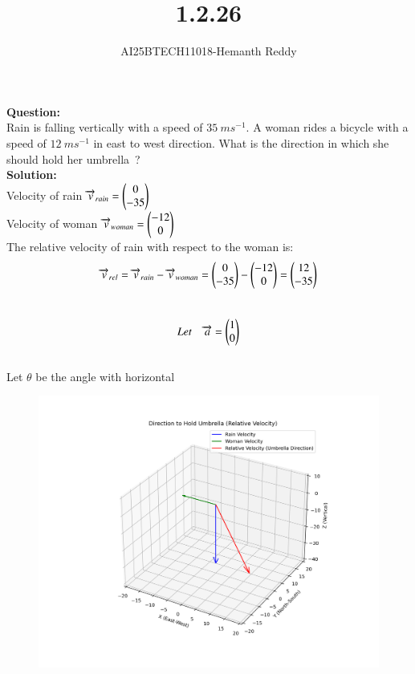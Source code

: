 \documentclass[journal]{IEEEtran}
\begin{document}

\vspace{3cm}

\title{1.2.26}
\author{AI25BTECH11018-Hemanth Reddy}
 \maketitle
{\let\newpage\relax\maketitle}

\renewcommand{\thefigure}{\theenumi}
\renewcommand{\thetable}{\theenumi}
\setlength{\intextsep}{10pt} %


\renewcommand{\thetable}{\theenumi}

\textbf{Question:}\\

Rain is falling vertically with a speed of $35~ms^{-1}$. A woman rides a bicycle with a speed of $12~ms^{-1}$ in east to west direction. What is the direction in which she should hold her umbrella~?\\
\textbf{Solution:}\\

Velocity of rain $\overrightarrow{v}_{rain}=\myvec{0\\
-35}$\\
\vspace{0.7cm}
Velocity of woman $\overrightarrow{v}_{woman}=\myvec{-12\\0}$\\
The relative velocity of rain with respect to the woman is:$$\overrightarrow{v}_{rel}=\overrightarrow{v}_{rain}-\overrightarrow{v}_{woman}\\ = \myvec{0\\
-35}-\myvec{-12\\0}= \myvec{12\\-35}$$\\
 $$Let \quad 
\overrightarrow{a} = \myvec{1\\0}$$\\

Let $\theta$ be the angle with horizontal\\

\begin{figure}
    \centering
    \includegraphics[width=0.8\columnwidth]{figs/fig.png}
    \caption{}
    \label{fig:placeholder}
\end{figure}
\end{document}
